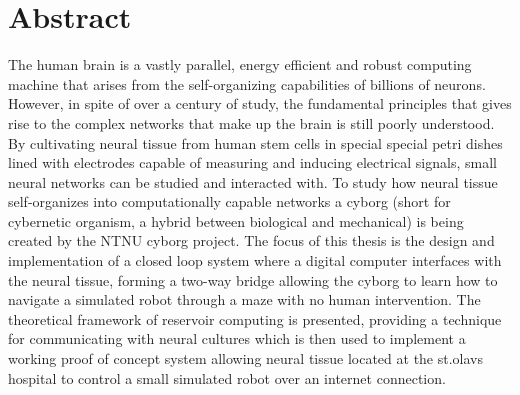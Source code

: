 \section*{\Huge Abstract}

The human brain is a vastly parallel, energy efficient and robust computing
machine that arises from the self-organizing capabilities of billions of neurons.
However, in spite of over a century of study, the fundamental principles that
gives rise to the complex networks that make up the brain is still poorly
understood.
%
By cultivating neural tissue from human stem cells in special special petri
dishes lined with electrodes capable of measuring and inducing electrical
signals, small neural networks can be studied and interacted with.
%
To study how neural tissue self-organizes into computationally capable networks
a cyborg (short for cybernetic organism, a hybrid between biological and
mechanical) is being created by the NTNU cyborg project.
%
The focus of this thesis is the design and implementation of a closed loop
system where a digital computer interfaces with the neural tissue, forming a
two-way bridge allowing the cyborg to learn how to navigate a simulated robot
through a maze with no human intervention.
%
The theoretical framework of reservoir computing is presented, providing a
technique for communicating with neural cultures which is then used to implement
a working proof of concept system allowing neural tissue located at the st.olavs
hospital to control a small simulated robot over an internet connection.
